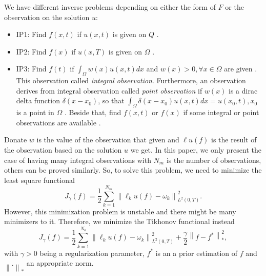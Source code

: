 \documentclass[]{article}
\begin{document}
We have different inverse problems depending on either the form of $F$ or the observation on the solution $u$: 
\begin{itemize}
	\item IP1: Find $f(x, t)$ if $u(x, t)$ is given on $Q$ \cite{a1, a2}.
	\item IP2: Find $f(x)$ if $u(x, T)$ is given on $\Omega$ \cite{a3, a4, a5, a6}.
	\item IP3: Find $f(t)$ if $\int_\Omega w(x)u(x, t)dx$ and $w(x)>0, \forall x\in \Omega$ are given \cite{a7, a8, a9}. This observation called \textit{integral observation}. Furthermore, an observation derives from integral observation called \textit{point observation} if $w(x)$ is a dirac delta function $\delta(x-x_0)$, so that $\int_\Omega\delta(x-x_0)u(x, t)dx=u(x_0, t), x_0$ is a point in $\Omega$ \cite{a10, a11, a12}. Beside that, find $f(x, t)$ or $f(x)$ if some integral or point observations are available \cite{a13}.
\end{itemize}
Donate $w$ is the value of the observation that given and $\ell u(f)$ is the result of the observation based on the solution $u$ we get. In this paper, we only present  the case of having many integral observations with $N_m$ is the number of observations, others can be proved similarly. So, to solve this problem, we need to minimize the least square functional \cite{a14, a15}
$$J_{\gamma}(f)=\frac{1}{2}\sum_{k=1}^{N_{m}}\left\|\ell_k u(f)-\omega_k\right\|_{L^2(0, T)}^2.$$
However, this minimization problem is unstable and there might be many minimizers to it. Therefore, we minimize the Tikhonov functional instead
$$J_{\gamma}(f)=\frac{1}{2}\sum_{k=1}^{N_{o}}\left\|\ell_k u(f)-\omega_k\right\|_{L^2(0, T)}^2+\frac{\gamma}{2}\left\|f-f^*\right\|_{*}^2,$$
with $\gamma>0$ being a regularization parameter, $f^*$ is an a prior estimation of $f$ and $\left\|.\right\|_*$ an appropriate norm.
\end{document}

